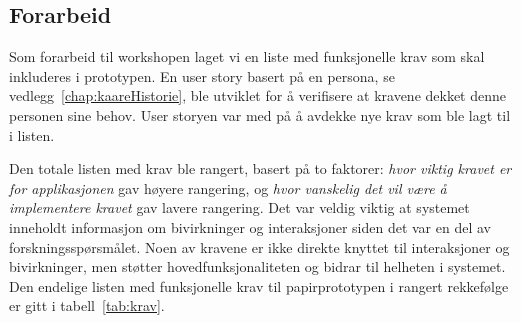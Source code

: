 \subsection{Forarbeid}
Som forarbeid til workshopen laget vi en liste med funksjonelle krav som skal inkluderes i prototypen. En user story basert på en persona, se vedlegg~\ref{chap:kaareHistorie}, ble utviklet for å verifisere at kravene dekket denne personen sine behov. User storyen var med på å avdekke nye krav som ble lagt til i listen. 

Den totale listen med krav ble rangert, basert på to faktorer: \textit{hvor viktig kravet er for applikasjonen} gav høyere rangering, og \textit{hvor vanskelig det vil være å implementere kravet} gav lavere rangering. Det var veldig viktig at systemet inneholdt informasjon om bivirkninger og interaksjoner siden det var en del av forskningsspørsmålet.
Noen av kravene er ikke direkte knyttet til interaksjoner og bivirkninger, men støtter hovedfunksjonaliteten og  bidrar til helheten i systemet. Den endelige listen med funksjonelle krav til papirprototypen i rangert rekkefølge er gitt i tabell~\ref{tab:krav}. 

